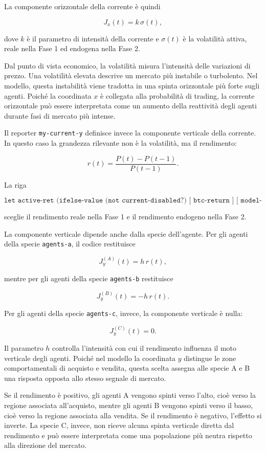 La componente orizzontale della corrente è quindi

\[
J_x(t)=k\,\sigma(t),
\]

dove \(k\) è il parametro di intensità della corrente e \(\sigma(t)\) è la
volatilità attiva, reale nella Fase 1 ed endogena nella Fase 2.

Dal punto di vista economico, la volatilità misura l'intensità delle variazioni
di prezzo. Una volatilità elevata descrive un mercato più instabile o turbolento.
Nel modello, questa instabilità viene tradotta in una spinta orizzontale più
forte sugli agenti. Poiché la coordinata \(x\) è collegata alla probabilità di
trading, la corrente orizzontale può essere interpretata come un aumento della
reattività degli agenti durante fasi di mercato più intense.

Il reporter \texttt{my-current-y} definisce invece la componente verticale della
corrente. In questo caso la grandezza rilevante non è la volatilità, ma il
rendimento:

\[
r(t)=\frac{P(t)-P(t-1)}{P(t-1)}.
\]

La riga

\[
\texttt{let active-ret (ifelse-value (not current-disabled?) [ btc-return ] [ model-return ])}
\]

sceglie il rendimento reale nella Fase 1 e il rendimento endogeno nella Fase 2.

La componente verticale dipende anche dalla specie dell'agente. Per gli agenti
della specie \texttt{agents-a}, il codice restituisce

\[
J_y^{(A)}(t)=h\,r(t),
\]

mentre per gli agenti della specie \texttt{agents-b} restituisce

\[
J_y^{(B)}(t)=-h\,r(t).
\]

Per gli agenti della specie \texttt{agents-c}, invece, la componente verticale è
nulla:

\[
J_y^{(C)}(t)=0.
\]

Il parametro \(h\) controlla l'intensità con cui il rendimento influenza il moto
verticale degli agenti. Poiché nel modello la coordinata \(y\) distingue le zone
comportamentali di acquisto e vendita, questa scelta assegna alle specie A e B
una risposta opposta allo stesso segnale di mercato.

Se il rendimento è positivo, gli agenti A vengono spinti verso l'alto, cioè verso
la regione associata all'acquisto, mentre gli agenti B vengono spinti verso il
basso, cioè verso la regione associata alla vendita. Se il rendimento è negativo,
l'effetto si inverte. La specie C, invece, non riceve alcuna spinta verticale
diretta dal rendimento e può essere interpretata come una popolazione più neutra
rispetto alla direzione del mercato.

